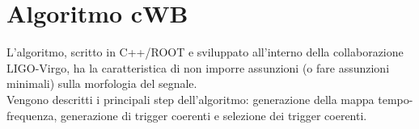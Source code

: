 \section{Algoritmo cWB}
L'algoritmo, scritto in C++/ROOT e sviluppato all'interno della collaborazione LIGO-Virgo, ha la caratteristica di non imporre assunzioni (o fare assunzioni minimali) sulla morfologia del segnale.\\
Vengono descritti i principali step dell'algoritmo: generazione della mappa tempo-frequenza, generazione di trigger coerenti e selezione dei trigger coerenti.
